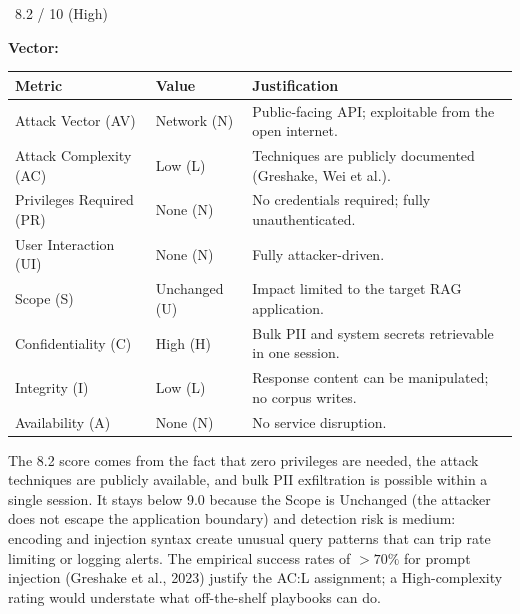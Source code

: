 \begin{cvssbox}{\badgehigh\ 8.2 / 10 (High)}
\vspace{2pt}
\begin{center}
\textbf{Vector:}\enspace
{}
\end{center}
\vspace{8pt}
\begin{tabular}{W{3.4cm}W{2.2cm}W{7.8cm}}
\toprule
  
  \small\textbf{Metric} &
  \small\textbf{Value} &
  \small\textbf{Justification} \\
  \midrule
  
  \small Attack Vector (AV)     & \small Network (N) & \small Public-facing API; exploitable from the open internet. \\
  
  \small Attack Complexity (AC) & \small Low (L)     & \small Techniques are publicly documented (Greshake, Wei et al.). \\
  
  \small Privileges Required (PR)  & \small None (N) & \small No credentials required; fully unauthenticated. \\
  
  \small User Interaction (UI)  & \small None (N)    & \small Fully attacker-driven. \\
  
  \small Scope (S)              & \small Unchanged (U) & \small Impact limited to the target RAG application. \\
  
  \small Confidentiality (C)    & \small High (H)    & \small Bulk PII and system secrets retrievable in one session. \\
  
  \small Integrity (I)          & \small Low (L)     & \small Response content can be manipulated; no corpus writes. \\
  
  \small Availability (A)       & \small None (N)    & \small No service disruption. \\
  \bottomrule
\end{tabular}
\vspace{6pt}

\small The 8.2 score comes from the fact that zero privileges are needed,
the attack techniques are publicly available, and bulk PII exfiltration is
possible within a single session. It stays below 9.0 because the Scope is
Unchanged (the attacker does not escape the application boundary) and
detection risk is medium: encoding and injection syntax create unusual
query patterns that can trip rate limiting or logging alerts. The empirical
success rates of $>70\%$ for prompt injection (Greshake et al., 2023)
justify the AC:L assignment; a High-complexity rating would understate
what off-the-shelf playbooks can do.
\end{cvssbox}


